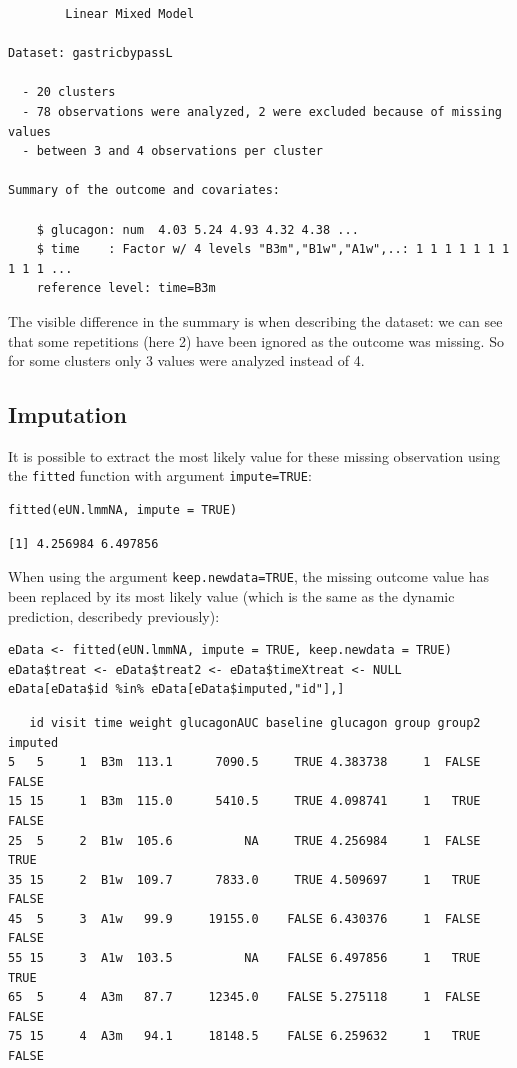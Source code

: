 \documentclass[12pt]{article}
\begin{document}
\begin{verbatim}
		Linear Mixed Model 
 
Dataset: gastricbypassL 

  - 20 clusters 
  - 78 observations were analyzed, 2 were excluded because of missing values 
  - between 3 and 4 observations per cluster 

Summary of the outcome and covariates: 

    $ glucagon: num  4.03 5.24 4.93 4.32 4.38 ...
    $ time    : Factor w/ 4 levels "B3m","B1w","A1w",..: 1 1 1 1 1 1 1 1 1 1 ...
    reference level: time=B3m
\end{verbatim}

The visible difference in the summary is when describing the dataset:
we can see that some repetitions (here 2) have been ignored as the
outcome was missing. So for some clusters only 3 values were analyzed
instead of 4.

\subsection{Imputation}
\label{sec:org262a94a}

It is possible to extract the most likely value for these missing
observation using the \texttt{fitted} function with argument \texttt{impute=TRUE}:
\lstset{language=r,label= ,caption= ,captionpos=b,numbers=none}
\begin{lstlisting}
fitted(eUN.lmmNA, impute = TRUE)
\end{lstlisting}

\begin{verbatim}
[1] 4.256984 6.497856
\end{verbatim}


When using the argument \texttt{keep.newdata=TRUE}, the missing outcome value
has been replaced by its most likely value (which is the same as the
dynamic prediction, describedy previously):
\lstset{language=r,label= ,caption= ,captionpos=b,numbers=none}
\begin{lstlisting}
eData <- fitted(eUN.lmmNA, impute = TRUE, keep.newdata = TRUE)
eData$treat <- eData$treat2 <- eData$timeXtreat <- NULL
eData[eData$id %in% eData[eData$imputed,"id"],]
\end{lstlisting}

\begin{verbatim}
   id visit time weight glucagonAUC baseline glucagon group group2 imputed
5   5     1  B3m  113.1      7090.5     TRUE 4.383738     1  FALSE   FALSE
15 15     1  B3m  115.0      5410.5     TRUE 4.098741     1   TRUE   FALSE
25  5     2  B1w  105.6          NA     TRUE 4.256984     1  FALSE    TRUE
35 15     2  B1w  109.7      7833.0     TRUE 4.509697     1   TRUE   FALSE
45  5     3  A1w   99.9     19155.0    FALSE 6.430376     1  FALSE   FALSE
55 15     3  A1w  103.5          NA    FALSE 6.497856     1   TRUE    TRUE
65  5     4  A3m   87.7     12345.0    FALSE 5.275118     1  FALSE   FALSE
75 15     4  A3m   94.1     18148.5    FALSE 6.259632     1   TRUE   FALSE
\end{verbatim}
\end{document}
